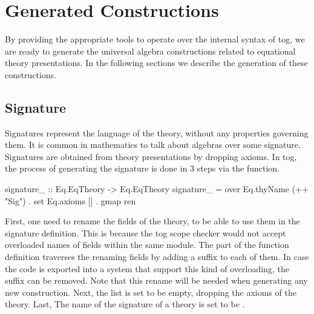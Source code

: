 
\section{Generated Constructions}
\label{sec:generatedConstructions}
By providing the appropriate tools to operate over the internal syntax of tog, we are ready to generate the universal algebra constructions related to equational theory presentations. In the following sections we describe the generation of these constructions. 

\subsection{Signature}
Signatures represent the language of the theory, without any properties governing them. It is common in mathematics to talk about algebras over some signature. Signatures are obtained from theory presentations by dropping axioms. In tog, the process of generating the signature is done in $3$ steps via the  function. 
\begin{hscode}
signature_ :: Eq.EqTheory -> Eq.EqTheory
signature_ = over Eq.thyName (++ "Sig") . set Eq.axioms [] .  gmap ren
\end{hscode}
First, one need to rename the fields of the theory, to be able to use them in the signature definition. This is because the tog scope checker would not accept overloaded names of fields within the same module. The  part of the function definition traverses the  renaming fields by adding a suffix  to each of them. In case the code is exported into a system that support this kind of overloading, the suffix can be removed. Note that this rename will be needed when generating any new construction. 
Next, the  list is set to be empty, dropping the axioms of the theory. 
Last, The name of the signature of a theory  is set to be . 

